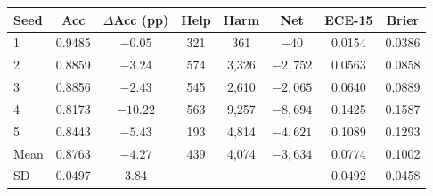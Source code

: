 \footnotesize
\setlength{\tabcolsep}{2.5pt}
\begin{tabular}{lccccccc}
\toprule
Seed & Acc & $\Delta$Acc (pp) & Help & Harm & Net & ECE-15 & Brier \\
\midrule
1 & 0.9485 & $-0.05$ & 321 & 361 & $-40$ & 0.0154 & 0.0386 \\
2 & 0.8859 & $-3.24$ & 574 & 3{,}326 & $-2{,}752$ & 0.0563 & 0.0858 \\
3 & 0.8856 & $-2.43$ & 545 & 2{,}610 & $-2{,}065$ & 0.0640 & 0.0889 \\
4 & 0.8173 & $-10.22$ & 563 & 9{,}257 & $-8{,}694$ & 0.1425 & 0.1587 \\
5 & 0.8443 & $-5.43$ & 193 & 4{,}814 & $-4{,}621$ & 0.1089 & 0.1293 \\
\midrule
Mean & 0.8763 & $-4.27$ & 439 & 4{,}074 & $-3{,}634$ & 0.0774 & 0.1002 \\
SD & 0.0497 & 3.84 & & & & 0.0492 & 0.0458 \\
\bottomrule
\end{tabular}
